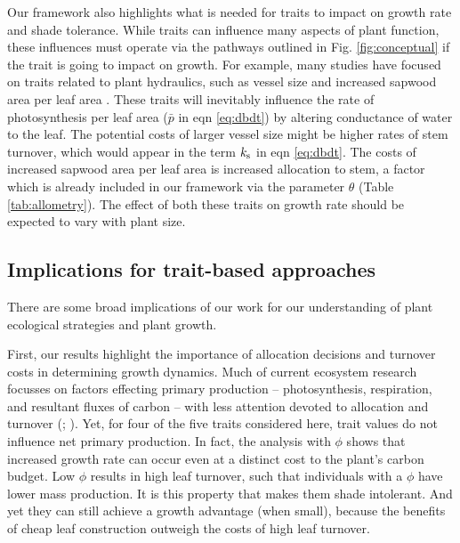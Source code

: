 \documentclass[a4paper,11pt]{article}
\begin{document}
Our framework also highlights what is needed for traits to impact on growth rate and shade tolerance. While traits can influence many aspects of plant function, these  influences must operate via the pathways outlined in Fig. \ref{fig:conceptual} if the trait is going to impact on growth. For example, many studies have focused on traits related to plant hydraulics, such as vessel size and increased sapwood area per leaf area \citep{Zanne-2010}. These traits will inevitably influence the rate of photosynthesis per leaf area ($\bar{p}$ in eqn \ref{eq:dbdt}) by altering conductance of water to the leaf. The potential costs of larger vessel size might be higher rates of stem turnover, which would appear in the term $k_{\rm s}$ in eqn \ref{eq:dbdt}. The costs of increased sapwood area per leaf area is increased allocation to stem, a factor which is already included in our framework via the parameter $\theta$ (Table \ref{tab:allometry}). The effect of both these traits on growth rate should be expected to vary with plant size.

\subsection{Implications for trait-based approaches}

There are some broad implications of our work for our understanding of plant ecological strategies and plant growth.

First, our results highlight the importance of allocation decisions and turnover costs in determining growth dynamics.
Much of current ecosystem research focusses on factors effecting primary production -- photosynthesis, respiration, and resultant fluxes of carbon -- with less attention devoted to allocation and turnover (\citealp{Friend-2014}; \citealp[for comparisons of models see][]{Sitch-2008, DeKauwe-2014}). Yet, for four of the five traits considered here, trait values do not influence net primary production. In fact, the analysis with $\phi$ shows that increased growth rate can occur even at a distinct cost to the plant's carbon budget. Low $\phi$ results in high leaf turnover, such that individuals with a $\phi$ have lower mass production. It is this property that makes them shade intolerant. And yet they can still achieve a growth advantage (when small), because the benefits of cheap leaf construction outweigh the costs of high leaf turnover.

\end{document}
